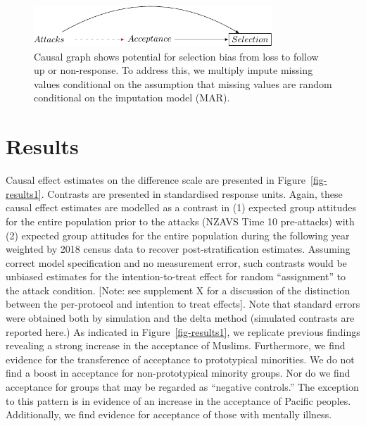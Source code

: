 \documentclass[
  singlecolumn]{report}
\begin{document}
\begin{figure}

{\centering \includegraphics[width=0.8\textwidth,height=\textheight]{gt-manuscript_files/figure-pdf/fig-dag-1.pdf}

}

\caption{\label{fig-dag}Causal graph shows potential for selection bias
from loss to follow up or non-response. To address this, we multiply
impute missing values conditional on the assumption that missing values
are random conditional on the imputation model (MAR).}

\end{figure}

\hypertarget{results}{%
\section{Results}\label{results}}

Causal effect estimates on the difference scale are presented in
Figure~\ref{fig-results1}. Contrasts are presented in standardised
response units. Again, these causal effect estimates are modelled as a
contrast in (1) expected group attitudes for the entire population prior
to the attacks (NZAVS Time 10 pre-attacks) with (2) expected group
attitudes for the entire population during the following year weighted
by 2018 census data to recover post-stratification estimates. Assuming
correct model specification and no measurement error, such contrasts
would be unbiased estimates for the intention-to-treat effect for random
``assignment'' to the attack condition. {[}Note: see supplement X for a
discussion of the distinction between the per-protocol and intention to
treat effects{]}. Note that standard errors were obtained both by
simulation and the delta method (simulated contrasts are reported here.)
As indicated in Figure~\ref{fig-results1}, we replicate previous
findings revealing a strong increase in the acceptance of Muslims.
Furthermore, we find evidence for the transference of acceptance to
prototypical minorities. We do not find a boost in acceptance for
non-prototypical minority groups. Nor do we find acceptance for groups
that may be regarded as ``negative controls.'' The exception to this
pattern is in evidence of an increase in the acceptance of Pacific
peoples. Additionally, we find evidence for acceptance of those with
mentally illness.
\end{document}
